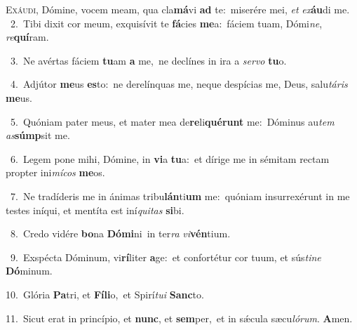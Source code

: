 \lettrine{\initial\textcolor{\initialcolor}{E}}{xáudi,} Dómine, vocem meam, qua cla\-\textbf{má}\-vi \textbf{ad} te:~\star miserére mei, \textit{et} \textit{ex}\-\textbf{áu}di me.\\
{\numbfont\textcolor{\numbcolor}{~2.}}~Tibi dixit cor meum, exquisívit te \textbf{fá}\-cies \textbf{me}\-a:~\star fáciem tuam, Dómi\-\textit{ne}\-, \textit{re}\-\textbf{quí}ram.\par
{\numbfont\textcolor{\numbcolor}{~3.}}~Ne avértas fáciem \textbf{tu}\-am \textbf{a} me,~\star ne declínes in ira a \textit{ser}\-\textit{vo} \textbf{tu}\-o.\par
{\numbfont\textcolor{\numbcolor}{~4.}}~Adjútor \textbf{me}\-us \textbf{es}\-to:~\star ne derelínquas me, neque despícias me, Deus, salu\-\textit{tá}\-\textit{ris} \textbf{me}\-us.\par
{\numbfont\textcolor{\numbcolor}{~5.}}~Quóniam pater meus, et mater mea de\-\textbf{re}\-li\-\textbf{qué}\-\textbf{runt} me:~\star Dóminus au\textit{tem} \textit{as}\-\textbf{súmp}sit me.\par
{\numbfont\textcolor{\numbcolor}{~6.}}~Legem pone mihi, Dómine, in \textbf{vi}\-a \textbf{tu}\-a:~\star et dírige me in sémitam rectam propter ini\-\textit{mí}\-\textit{cos} \textbf{me}\-os.\par
{\numbfont\textcolor{\numbcolor}{~7.}}~Ne tradíderis me in ánimas tribu\-\textbf{lán}\-ti\textbf{um} me:~\star quóniam insurrexérunt in me testes iníqui, et mentíta est iní\-\textit{qui}\-\textit{tas} \textbf{si}\-bi.\par
{\numbfont\textcolor{\numbcolor}{~8.}}~Credo vidére \textbf{bo}\-na \textbf{Dó}\-\textbf{mi}ni~\star in ter\textit{ra} \textit{vi}\-\textbf{vén}tium.\par
{\numbfont\textcolor{\numbcolor}{~9.}}~Exspécta Dóminum, vi\-\textbf{rí}\-liter \textbf{a}\-ge:~\star et confortétur cor tuum, et sús\-\textit{ti}\-\textit{ne} \textbf{Dó}\-minum.\par
{\numbfont\textcolor{\numbcolor}{10.}}~Glória \textbf{Pa}\-tri, et \textbf{Fí}\-\textbf{li}o,~\star et Spirí\-\textit{tu}\-\textit{i} \textbf{Sanc}\-to.\par
{\numbfont\textcolor{\numbcolor}{11.}}~Sicut erat in princípio, et \textbf{nunc}\-, et \textbf{sem}\-per,~\star et in sǽcula sæcu\-\textit{ló}\-\textit{rum}. \textbf{A}\-men.\par
